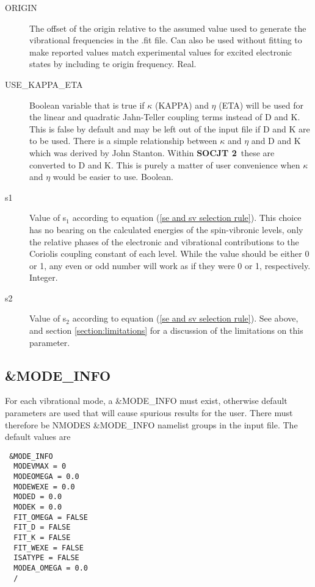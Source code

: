 \documentclass{article}
\newcommand{\socjttwo}{{\bf SOCJT 2}}
\begin{document}
\begin{description}
  \item[ORIGIN] The offset of the origin relative to the assumed value used to generate the vibrational frequencies in the .fit file. Can also be used without fitting to make reported values match experimental values for excited electronic states by including te origin frequency. Real.
  
  
  \item[USE\_KAPPA\_ETA] Boolean variable that is true if $\kappa$ (KAPPA) and 
  $\eta$ (ETA) will be used for the linear and quadratic Jahn-Teller coupling
  terms instead of D and K. This is false by default and may be left out of the
  input file if D and K are to be used. There is a simple relationship between
  $\kappa$ and $\eta$ and D and K which was derived by John Stanton. Within
  \socjttwo\ these are converted to D and K. This is purely a matter of user convenience
  when $\kappa$ and $\eta$ would be easier to use. Boolean.

\item[s1] Value of s$_1$ according to equation (\ref{se and sv
    selection rule}). This choice has no bearing on the calculated
  energies of the spin-vibronic levels, only the relative phases of
  the electronic and vibrational contributions to the Coriolis
  coupling constant of each level. While the value should be either 0
  or 1, any even or odd number will work as if they were 0 or 1,
  respectively. Integer. 

\item[s2] Value of s$_2$ according to equation (\ref{se and sv
    selection rule}). See above, and section \ref{section:limitations}
  for a discussion of the limitations on this parameter.

\end{description}

\subsection{\&MODE\_INFO}

For each vibrational mode, a \&MODE\_INFO must exist, otherwise
default parameters are used that will cause spurious results for the
user. There must therefore be NMODES \&MODE\_INFO namelist groups in
the input file. The default values are

\begin{verbatim}
 &MODE_INFO
  MODEVMAX = 0
  MODEOMEGA = 0.0
  MODEWEXE = 0.0
  MODED = 0.0
  MODEK = 0.0
  FIT_OMEGA = FALSE
  FIT_D = FALSE
  FIT_K = FALSE
  FIT_WEXE = FALSE
  ISATYPE = FALSE
  MODEA_OMEGA = 0.0
  /
\end{verbatim}
\end{document}
